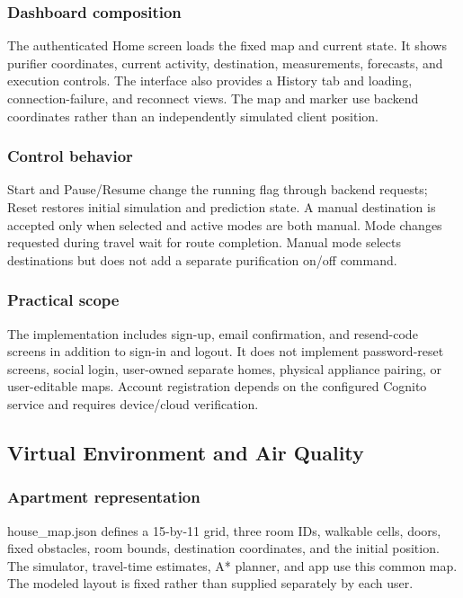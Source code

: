 \documentclass[conference]{IEEEtran}
\begin{document}
\subsubsection{Dashboard composition}

The authenticated Home screen loads the fixed map and current state. It shows purifier coordinates, current activity, destination, measurements, forecasts, and execution controls. The interface also provides a History tab and loading, connection-failure, and reconnect views. The map and marker use backend coordinates rather than an independently simulated client position.

\subsubsection{Control behavior}

Start and Pause/Resume change the running flag through backend requests; Reset restores initial simulation and prediction state. A manual destination is accepted only when selected and active modes are both manual. Mode changes requested during travel wait for route completion. Manual mode selects destinations but does not add a separate purification on/off command.

\subsubsection{Practical scope}

The implementation includes sign-up, email confirmation, and resend-code screens in addition to sign-in and logout. It does not implement password-reset screens, social login, user-owned separate homes, physical appliance pairing, or user-editable maps. Account registration depends on the configured Cognito service and requires device/cloud verification.

\subsection{Virtual Environment and Air Quality}

\subsubsection{Apartment representation}

house\_\allowbreak{}map.json defines a 15-by-11 grid, three room IDs, walkable cells, doors, fixed obstacles, room bounds, destination coordinates, and the initial position. The simulator, travel-time estimates, A* planner, and app use this common map. The modeled layout is fixed rather than supplied separately by each user.
\end{document}
